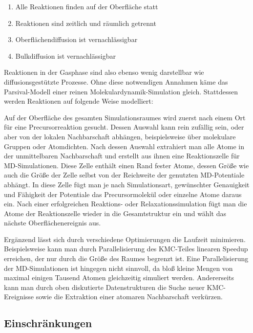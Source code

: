 \begin{enumerate}
\item Alle Reaktionen finden auf der Oberfläche statt
\item Reaktionen sind zeitlich und räumlich getrennt
\item Oberflächendiffusion ist vernachlässigbar
\item Bulkdiffusion ist vernachlässigbar
\end{enumerate}

Reaktionen in der Gasphase sind also ebenso wenig darstellbar wie diffusionsgestützte Prozesse.
Ohne diese notwendigen Annahmen käme das Parsival-Modell einer reinen Molekular\-dynamik-Simu\-lation gleich.
Stattdessen werden Reaktionen auf folgende Weise modelliert:

Auf der Oberfläche des gesamten Simulationsraumes wird zuerst nach einem Ort für eine Precursorreaktion gesucht.
Dessen Auswahl kann rein zufällig sein, oder aber von der lokalen Nachbarschaft abhängen, beispielsweise über molekulare Gruppen oder Atomdichten.
Nach dessen Auswahl extrahiert man alle Atome in der unmittelbaren Nachbarschaft und erstellt aus ihnen eine Reaktionszelle für MD-Simulationen.
Diese Zelle enthält einen Rand fester Atome, dessen Größe wie auch die Größe der Zelle selbst von der Reichweite der genutzten MD-Potentiale abhängt.
In diese Zelle fügt man je nach Simulationsart, gewünschter Genauigkeit und Fähigkeit der Potentiale das Precursormolekül oder einzelne Atome daraus ein.
Nach einer erfolgreichen Reaktions- oder Relaxationssimulation fügt man die Atome der Reaktionszelle wieder in die Gesamtstruktur ein und wählt das nächste Oberflächenereignis aus.

Ergänzend lässt sich durch verschiedene Optimierungen die Laufzeit minimieren.
Beispielsweise kann man durch Parallelisierung des KMC-Teiles linearen Speedup  erreichen, der nur durch die Größe des Raumes begrenzt ist.
Eine Parallelisierung der MD-Simulationen ist hingegen nicht sinnvoll, da bloß kleine Mengen von maximal einigen Tausend Atomen gleichzeitig simuliert werden.
Andererseits kann man durch oben diskutierte Datenstrukturen die Suche neuer KMC-Ereignisse sowie die Extraktion einer atomaren Nachbarschaft verkürzen.


\subsection{Einschränkungen}

